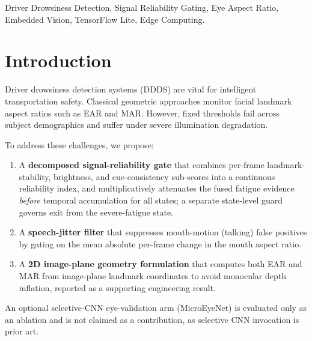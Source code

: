 \documentclass[10pt,conference]{IEEEtran}
\begin{document}
\begin{IEEEkeywords}
Driver Drowsiness Detection, Signal Reliability Gating, Eye Aspect Ratio, Embedded Vision, TensorFlow Lite, Edge Computing.
\end{IEEEkeywords}

\section{Introduction}
Driver drowsiness detection systems (DDDS) are vital for intelligent transportation safety. Classical geometric approaches monitor facial landmark aspect ratios such as EAR and MAR. However, fixed thresholds fail across subject demographics and suffer under severe illumination degradation.

To address these challenges, we propose:
\begin{enumerate}
    \item A \textbf{decomposed signal-reliability gate} that combines per-frame landmark-stability, brightness, and cue-consistency sub-scores into a continuous reliability index, and multiplicatively attenuates the fused fatigue evidence \emph{before} temporal accumulation for all states; a separate state-level guard governs exit from the severe-fatigue state.
    \item A \textbf{speech-jitter filter} that suppresses mouth-motion (talking) false positives by gating on the mean absolute per-frame change in the mouth aspect ratio.
    \item A \textbf{2D image-plane geometry formulation} that computes both EAR and MAR from image-plane landmark coordinates to avoid monocular depth inflation, reported as a supporting engineering result.
\end{enumerate}
An optional selective-CNN eye-validation arm (MicroEyeNet) is evaluated only as an ablation and is not claimed as a contribution, as selective CNN invocation is prior art.
\end{document}
